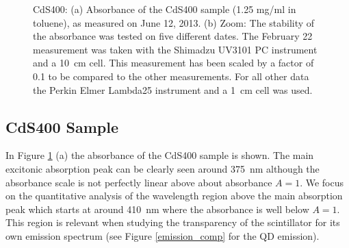 \documentclass[cits]{JINST}
\begin{document}
\begin{figure}[tb]
\begin{center}
\caption[]{CdS400: (a) Absorbance of the CdS400 sample (1.25 mg/ml in toluene), as measured on June 12, 2013. (b) Zoom: The stability of the absorbance was tested on five different dates. The February 22 measurement was taken with the Shimadzu UV3101 PC instrument and a 10~cm cell. This measurement has been scaled by a factor of 0.1 to be compared to the other measurements. For all other data the Perkin Elmer Lambda25 instrument and a 1~cm cell was used. \label{cds400_stability}}
\end{center}
\end{figure}

\subsection{CdS400 Sample}
In Figure \ref{cds400_stability} (a) the absorbance of the CdS400 sample is shown. The main excitonic absorption peak can be clearly seen around 375~nm although the absorbance scale is not perfectly linear above about absorbance $A=1$. We focus on the quantitative analysis of the wavelength region above the main absorption peak which starts at around 410~nm where the absorbance is well below $A=1$. This region is relevant when studying the transparency of the scintillator for its own emission spectrum (see Figure \ref{emission_comp} for the QD emission). 
\end{document}
